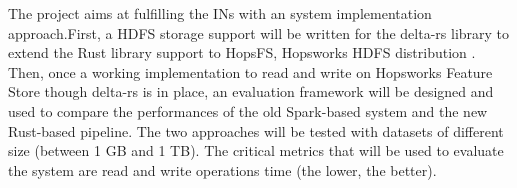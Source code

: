 The project aims at fulfilling the \glspl{IN} with an system implementation approach.First, a \gls{HDFS} storage support will be written for the delta-rs library to extend the Rust library support to HopsFS, Hopsworks \gls{HDFS} distribution \cite{niaziHopsFSScalingHierarchical2017}. Then, once a working implementation to read and write on Hopsworks Feature Store though delta-rs is in place, an evaluation framework will be designed and used to compare the performances of the old Spark-based system and the new Rust-based pipeline. The two approaches will be tested with datasets of different size (between 1 GB and 1 TB). The critical metrics that will be used to evaluate the system are read and write operations time (the lower, the better). 